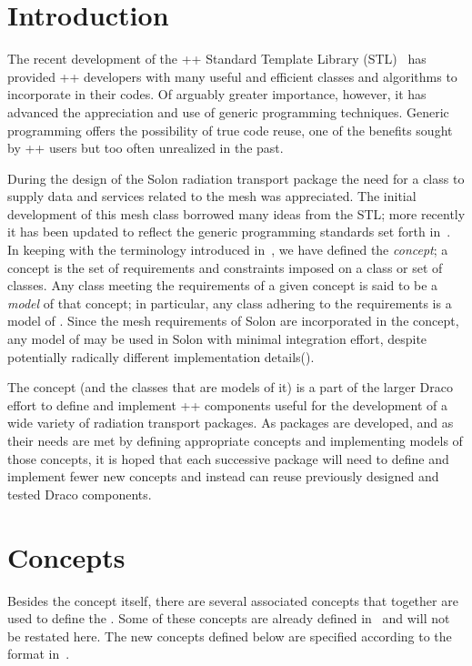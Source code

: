 \documentclass[11pt]{rnote}
\begin{document}
\section{Introduction}

The recent development of the \C++ Standard Template Library
(STL)~\cite{ansi:cpp} has
provided \C++ developers with many useful and efficient classes and
algorithms to incorporate in their codes. Of arguably greater
importance, however, it has advanced the appreciation and use of
generic programming techniques. Generic programming offers the
possibility of true code reuse, one of the benefits sought by \C++
users but too often unrealized in the past.

During the design of the Solon radiation transport package the need
for a class to supply data and services related to the mesh was
appreciated. The initial development of this mesh class borrowed many
ideas from the STL; more recently it has been updated to reflect the
generic programming standards set forth in~\cite{au99}. In keeping with the
terminology introduced in~\cite{au99}, we have defined the  {\it
  concept}; a concept is the set of requirements and constraints
imposed on a class or set of classes. Any class meeting the
requirements of a given concept is said to be a {\it model} of that
concept; in particular, any class adhering to the 
requirements is a model of . Since the mesh requirements
of Solon are incorporated in the  concept, any model of
 may be used in Solon with minimal integration effort,
despite potentially radically different implementation details().

The  concept (and the classes that are models of it) is a
part of the larger Draco effort to define and implement \C++ components 
useful for the development of a wide variety of radiation transport
packages. As packages are developed, and as their needs are met by
defining appropriate concepts and implementing models of those
concepts, it is hoped that each successive package will need to define 
and implement fewer new concepts and instead can reuse previously
designed and tested Draco components.

\section{Concepts}

Besides the  concept itself, there are several associated
concepts that together are used to define the . Some of
these concepts are already defined in~\cite{au99} and will not be restated
here. The new concepts defined below are specified according to the
format in~\cite{au99}.
\end{document}
